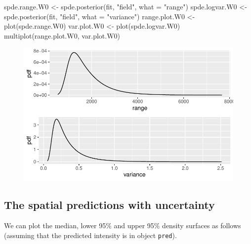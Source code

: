 \documentclass[
  a4paper,
]{article}
\newenvironment{Shaded}{\begin{snugshade}}{\end{snugshade}}
\newcommand{\AttributeTok}[1]{\textcolor[rgb]{0.40,0.45,0.13}{#1}}
\newcommand{\FunctionTok}[1]{\textcolor[rgb]{0.28,0.35,0.67}{#1}}
\newcommand{\NormalTok}[1]{\textcolor[rgb]{0.00,0.23,0.31}{#1}}
\newcommand{\OtherTok}[1]{\textcolor[rgb]{0.00,0.23,0.31}{#1}}
\newcommand{\StringTok}[1]{\textcolor[rgb]{0.13,0.47,0.30}{#1}}
\begin{document}
\begin{Shaded}
\begin{Highlighting}[]
\NormalTok{spde.range.W0 }\OtherTok{\textless{}{-}} \FunctionTok{spde.posterior}\NormalTok{(fit, }\StringTok{"field"}\NormalTok{, }\AttributeTok{what =} \StringTok{"range"}\NormalTok{)}
\NormalTok{spde.logvar.W0 }\OtherTok{\textless{}{-}} \FunctionTok{spde.posterior}\NormalTok{(fit, }\StringTok{"field"}\NormalTok{, }\AttributeTok{what =} \StringTok{"variance"}\NormalTok{)}
\NormalTok{range.plot.W0 }\OtherTok{\textless{}{-}} \FunctionTok{plot}\NormalTok{(spde.range.W0)}
\NormalTok{var.plot.W0 }\OtherTok{\textless{}{-}} \FunctionTok{plot}\NormalTok{(spde.logvar.W0)}
\FunctionTok{multiplot}\NormalTok{(range.plot.W0, var.plot.W0)}
\end{Highlighting}
\end{Shaded}

\begin{figure}[H]

{\centering \includegraphics{pedometron_files/figure-pdf/unnamed-chunk-12-1.pdf}

}

\end{figure}

\hypertarget{the-spatial-predictions-with-uncertainty}{%
\subsection{The spatial predictions with
uncertainty}\label{the-spatial-predictions-with-uncertainty}}

We can plot the median, lower 95\% and upper 95\% density surfaces as
follows (assuming that the predicted intensity is in object
\texttt{pred}).
\end{document}
